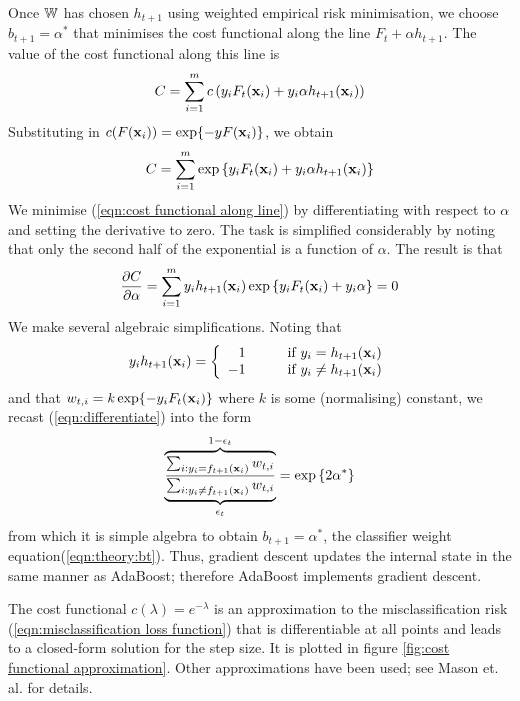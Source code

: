 Once $\mathbb{W}$ has chosen $h_{t+1}$ using weighted empirical risk
minimisation, we choose $b_{t+1} = \alpha^{\ast}$ that minimises the
cost functional along the line $F_t + \alpha h_{t+1}$.  The value of
the cost functional along this line is
%
\begin{equation}
C = \sum_{i=1}^{m} c \left( y_i F_t(\mathbf{x}_i) + y_i \alpha
h_{t+1}(\mathbf{x}_i) \right)
\end{equation}
%
Substituting in $c(F(\mathbf{x}_i)) = \exp \{-yF(\mathbf{x}_i) \}$, we obtain
%
\begin{equation}
C = \sum_{i=1}^{m} \exp \left\{ y_i F_t(\mathbf{x}_i) + y_i \alpha
h_{t+1}(\mathbf{x}_i) \right\}
\label{eqn:cost functional along line}
\end{equation}
%
We minimise (\ref{eqn:cost functional along line}) by
differentiating with respect to $\alpha$ and setting the derivative to
zero.  The task is simplified considerably by noting that only the
second half of the exponential is a function of $\alpha$.  The result
is that
%
\begin{equation}
\label{eqn:differentiate}
\frac{\partial C}{\partial \alpha}
= \sum_{i=1}^{m} y_i h_{t+1}(\mathbf{x}_i) \exp \left\{ y_i F_t(\mathbf{x}_i) +
y_i \alpha \right\} = 0
\end{equation}
%
We make several algebraic simplifications.  Noting that
%
\begin{equation}
y_i h_{t+1}(\mathbf{x}_i) = \left\{ 
	\begin{array}{rl}
	1 &	\qquad \mbox{if $y_i = h_{t+1}(\mathbf{x}_i)$} \\
	-1 &	\qquad \mbox{if $y_i \neq h_{t+1}(\mathbf{x}_i)$}
	\end{array}
\right. 
\end{equation}
%
and that $w_{t,i} = k \exp \{ -y_i F_t(\mathbf{x}_i) \}$ where $k$ is some
(normalising) constant, we recast (\ref{eqn:differentiate}) into
the form 
%
\begin{equation}
\overbrace{
\underbrace{
	\frac{\sum_{i : y_i = f_{t+1}(\mathbf{x}_i)} w_{t,i}}
	     {\sum_{i : y_i \neq f_{t+1}(\mathbf{x}_i)} w_{t,i}}
}_{\epsilon_t}
}^{1 - \epsilon_t}
= \exp \left\{ 2 \alpha^{\ast} \right\} 
\end{equation}
%
from which it is simple algebra to obtain $b_{t+1} = \alpha^{\ast}$,
the classifier weight equation(\ref{eqn:theory:bt}). Thus, gradient
descent updates the internal state in the same manner as AdaBoost;
therefore AdaBoost implements gradient descent. 

The cost functional $c(\lambda) = e^{-\lambda}$ is an approximation to
the misclassification risk (\ref{eqn:misclassification loss function})
that is differentiable at all points and leads to a closed-form
solution for the step size.  It is plotted in figure \ref{fig:cost
functional approximation}.  Other approximations have been used; see
Mason et. al. \cite{Mason99} for details.

